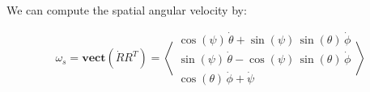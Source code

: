 \documentclass[12pt, letterpaper]{../assignment}
\begin{document}


We can compute the spatial angular velocity by:

\begin{answer}
$$ \omega_s = \textbf{vect}\left( \dot{R} R^T \right) =
\left<\begin{array}{c} \cos\left(\psi \right)\,\dot{\theta} +\sin\left(\psi \right)\,\sin\left(\theta \right)\,\dot{\phi} \\ \sin\left(\psi \right)\,\dot{\theta} -\cos\left(\psi \right)\,\sin\left(\theta \right)\,\dot{\phi} \\ \cos\left(\theta \right)\,\dot{\phi} +\dot{\psi}  \end{array}\right>$$
\end{answer}
\end{document}
